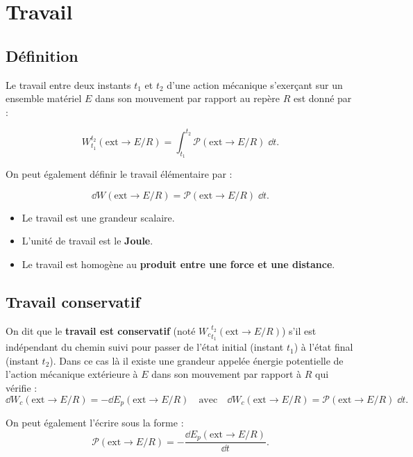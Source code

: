 \documentclass[10pt,fleqn]{article} %
\begin{document}
\section{Travail}
\subsection{Définition}
\begin{defi}[Travail]
Le travail entre deux instants $t_1$ et $t_2$ d'une action mécanique s'exerçant sur un ensemble matériel $E$ dans son mouvement par rapport au repère $R$ est donné par :

$$
\displaystyle{W^{t_2}_{t_1}}(\text{ext} \rightarrow E/R)=\displaystyle{\int_{t_1}^{t_2}}\mathcal{P}(\text{ext} \rightarrow E/R)\;\dd t.
$$
\end{defi}

\begin{rem}%
On peut également définir le travail élémentaire par :

$$\dd W(\text{ext} \rightarrow E/R)=\mathcal{P}(\text{ext} \rightarrow E/R)\;\dd t.
$$

\begin{itemize}
\item Le travail est une grandeur scalaire.
\item L'unité de travail est le \textbf{Joule}.
\item Le travail est homogène au \textbf{produit entre une force et une distance}.
\end{itemize}

\end{rem}%



\subsection{Travail conservatif}

\begin{defi}
On dit que le \textbf{travail est conservatif} (noté $\displaystyle{{W_c}^{t_2}_{t_1}}(\text{ext} \rightarrow E/R)$) s'il est indépendant du chemin suivi pour passer de l'état initial (instant $t_1$) à l'état final (instant $t_2$).
Dans ce cas là il existe une grandeur appelée énergie potentielle de l'action mécanique extérieure à $E$ dans son mouvement par rapport à $R$ qui vérifie :
$$
\dd W_c(\text{ext} \rightarrow E/R)=-\dd E_p(\text{ext} \rightarrow E/R) \quad
\text{avec}
\quad
\dd W_c(\text{ext} \rightarrow E/R)=\mathcal{P}(\text{ext} \rightarrow E/R)\;\dd t.
$$

On peut également l'écrire sous la forme :
$$
\mathcal{P}(\text{ext} \rightarrow E/R)=-\frac{\dd E_p(\text{ext} \rightarrow E/R)}{\dd t}.
$$
\end{defi}
\end{document}
